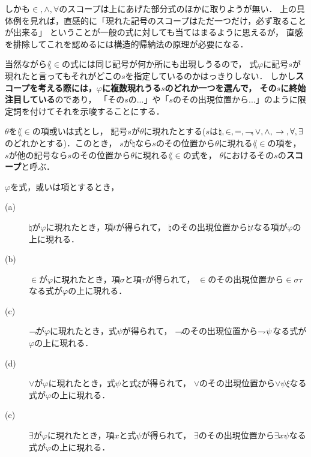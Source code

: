 	しかも$\in,\wedge,\forall$のスコープは上にあげた部分式のほかに取りようが無い．
	上の具体例を見れば，直感的に「現れた記号のスコープはただ一つだけ，必ず取ることが出来る」
	ということが一般の式に対しても当てはまるように思えるが，
	直感を排除してこれを認めるには構造的帰納法の原理が必要になる．
	
	当然ながら$\lang{\in}$の式には同じ記号が何か所にも出現しうるので，
	式$\varphi$に記号$s$が現れたと言ってもそれがどこの$s$を指定しているのかはっきりしない．
	しかし{\bf スコープを考える際には，$\varphi$に複数現れうる$s$のどれか一つを選んで，
	その$s$に終始注目している}のであり，
	「その$s$の...」や「$s$のその出現位置から...」のように限定詞を付けてそれを示唆することにする．
	
	\begin{screen}
		\begin{metadfn}
		\label{metadfn:L_in_scope}
			$\theta$を$\lang{\in}$の項或いは式とし，
			記号$s$が$\theta$に現れたとする($s$は$\natural,\in,=,\rightharpoondown\hspace{-0.25em},\vee,\wedge,
			\hspace{0.25em}\rightarrow\hspace{0.25em},\forall,\exists$のどれかとする)．このとき，
			$s$が$\natural$なら$s$のその位置から$\theta$に現れる$\lang{\in}$の項を，
			$s$が他の記号なら$s$のその位置から$\theta$に現れる$\lang{\in}$の式を，
			$\theta$におけるその$s$の{\bf スコープ}と呼ぶ．
		\end{metadfn}
	\end{screen}
	
	\begin{screen}
		\begin{metathm}[スコープの存在]\label{metathm:existence_of_scopes_L_in}
		$\varphi$を式，或いは項とするとき，
		\begin{description}
			\item[(a)] $\natural$が$\varphi$に現れたとき，項$t$が得られて，
				$\natural$のその出現位置から$\natural t$なる項が$\varphi$の上に現れる．
				
			\item[(b)] $\in$が$\varphi$に現れたとき，項$\sigma$と項$\tau$が得られて，
				$\in$のその出現位置から$\in \sigma \tau$なる式が$\varphi$の上に現れる．
				
			\item[(c)] $\rightharpoondown\hspace{-0.25em}$が$\varphi$に現れたとき，式$\psi$が得られて，
				$\rightharpoondown\hspace{-0.25em}$のその出現位置から$\rightharpoondown\hspace{-0.25em} \psi$なる式が
				$\varphi$の上に現れる．
				
			\item[(d)] $\vee$が$\varphi$に現れたとき，式$\psi$と式$\xi$が得られて，
				$\vee$のその出現位置から$\vee \psi \xi$なる式が$\varphi$の上に現れる．
				
			\item[(e)] $\exists$が$\varphi$に現れたとき，項$x$と式$\psi$が得られて，
				$\exists$のその出現位置から$\exists x \psi$なる式が$\varphi$の上に現れる．
		\end{description}
		\end{metathm}
	\end{screen}
	
